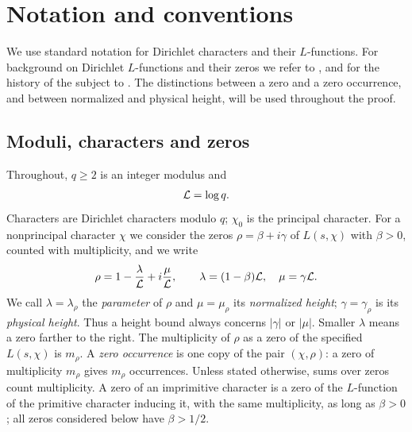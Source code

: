 \section{Notation and conventions}\label{sec:notation}

We use standard notation for Dirichlet characters and their $L$-functions. For background on
Dirichlet $L$-functions and their zeros we refer to
\cite{Ingham1932distribution,Titchmarsh1986theory,Karatsuba1993basic,Montgomery1994ten,
Davenport2000multiplicative,IwaniecKowalski2004analytic,MontgomeryVaughan2007multiplicative,
Tenenbaum2015introduction}, and for the history of the subject to \cite{Narkiewicz2000development}. The distinctions between a zero and a zero occurrence, and between
normalized and physical height, will be used throughout the proof.

\subsection{Moduli, characters and zeros}
Throughout, $q\ge2$ is an integer modulus and
\[
  \mathcal{L}=\log q .
\]
Characters are Dirichlet characters modulo $q$; $\chi_0$ is the principal character. For a
nonprincipal character $\chi$ we consider the zeros $\rho=\beta+i\gamma$ of $L(s,\chi)$ with
$\beta>0$, counted with multiplicity, and we write
\begin{equation}\label{eq:normalized}
  \rho=1-\frac{\lambda}{\mathcal{L}}+i\frac{\mu}{\mathcal{L}},\qquad \lambda=(1-\beta)\mathcal{L},\quad \mu=\gamma\mathcal{L} .
\end{equation}
We call $\lambda=\lambda_\rho$ the \emph{parameter} of $\rho$ and $\mu=\mu_\rho$ its
\emph{normalized height}; $\gamma=\gamma_\rho$ is its \emph{physical height}. Thus a height
bound always concerns $|\gamma|$ or $|\mu|$. Smaller $\lambda$ means a zero farther to the
right. The multiplicity of $\rho$ as a zero of the specified $L(s,\chi)$ is $m_\rho$.
A \emph{zero occurrence} is one copy of the pair $(\chi,\rho)$: a zero of multiplicity
$m_\rho$ gives $m_\rho$ occurrences. Unless stated otherwise, sums over zeros count
multiplicity. A zero of an imprimitive character is a zero of the
$L$-function of the primitive character inducing it, with the same multiplicity, as long as
$\beta>0$; all zeros considered below have $\beta>1/2$.

